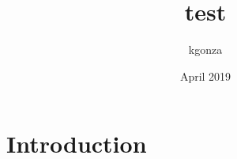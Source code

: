 \documentclass{article}
\title{test}
\author{kgonza }
\date{April 2019}
\begin{document}
\maketitle

\section{Introduction}
\end{document}
